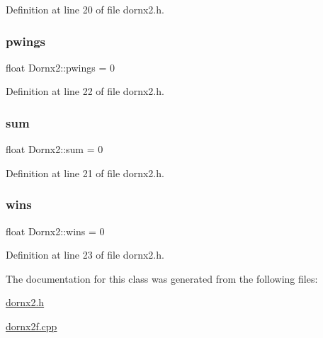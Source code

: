 Definition at line 20 of file dornx2.\+h.

\mbox{\label{class_dornx2_a08c22beb426bb80169c29bd6fe382781}} 
\subsubsection{\texorpdfstring{pwings}{pwings}}
{\footnotesize\ttfamily float Dornx2\+::pwings = 0}



Definition at line 22 of file dornx2.\+h.

\mbox{\label{class_dornx2_a9721d2b992a38ebf38b3d9ba1106ac24}} 
\subsubsection{\texorpdfstring{sum}{sum}}
{\footnotesize\ttfamily float Dornx2\+::sum = 0}



Definition at line 21 of file dornx2.\+h.

\mbox{\label{class_dornx2_aeb5ee2bf43b55d212169fe6842c4dda0}} 
\subsubsection{\texorpdfstring{wins}{wins}}
{\footnotesize\ttfamily float Dornx2\+::wins = 0}



Definition at line 23 of file dornx2.\+h.



The documentation for this class was generated from the following files\+:\begin{DoxyCompactItemize}
\item 
\hyperlink{dornx2_8h}{dornx2.\+h}\item 
\hyperlink{dornx2f_8cpp}{dornx2f.\+cpp}\end{DoxyCompactItemize}

